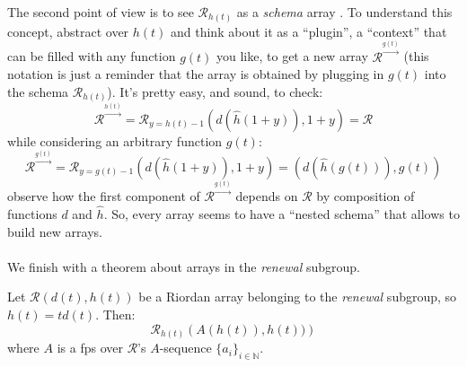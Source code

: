 The second point of view is to see $\mathcal{R}_{h(t)}$ as a \emph{schema} array 
.
To understand this concept, abstract over $h(t)$ and think about it as a ``plugin'', 
a ``context'' that can be filled with any function $g(t)$ you like, to get a new array
$\mathcal{R}^{\stackrel{g(t)}{\rightarrow}}$ (this notation is just a reminder that the array is obtained
by plugging in $g(t)$ into the schema $\mathcal{R}_{h(t)}$). It's pretty easy, and sound, to check:
\begin{displaymath}
    \mathcal{R}^{\stackrel{h(t)}{\rightarrow}} = \mathcal{R}_{y=h(t)-1}\left( d(\hat{h}(1+y)), 1+y \right) = \mathcal{R}
\end{displaymath}
while considering an arbitrary function $g(t)$:
\begin{displaymath}
    \mathcal{R}^{\stackrel{g(t)}{\rightarrow}} = \mathcal{R}_{y=g(t)-1}\left( d(\hat{h}(1+y)), 1+y \right) = 
    \left( d(\hat{h}(g(t))), g(t) \right) 
\end{displaymath}
observe how the first component of $\mathcal{R}^{\stackrel{g(t)}{\rightarrow}}$ depends on
$\mathcal{R}$ by composition of functions $d$ and $\hat{h}$. So, every array seems to have
a ``nested schema'' that allows to build new arrays.
\\\\
We finish with a theorem about arrays in the \emph{renewal} subgroup.

\begin{theorem}
    Let $\mathcal{R}\left(d(t), h(t)\right)$ be a Riordan array belonging
    to the \emph{renewal} subgroup, so $h(t)=td(t)$. Then:
    \begin{displaymath}
        \mathcal{R}_{h(t)}\left(A(h(t)), h(t))\right)
    \end{displaymath}
    where $A$ is a \ac{fps} over $\mathcal{R}$'s $A$-sequence 
    $\lbrace a_i \rbrace_{i\in\mathbb{N}}$. 
\end{theorem}

